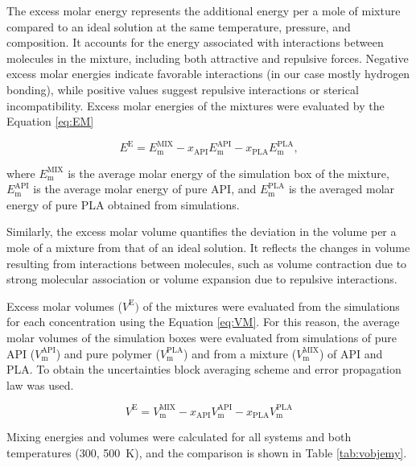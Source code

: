 The excess molar energy represents the additional energy per a mole of mixture compared to an ideal solution at the same temperature, pressure, and composition. It accounts for the energy associated with interactions between molecules in the mixture, including both attractive and repulsive forces. Negative excess molar energies indicate favorable interactions (in our case mostly hydrogen bonding), while positive values suggest repulsive interactions or sterical incompatibility. Excess molar energies of the mixtures were evaluated by the Equation \ref{eq:EM}

\begin{equation}\label{eq:EM}
	E^\text{E} = E_{\text{m}}^{\text{MIX}} - x_{\text{API}} E_{\text{m}}^{\text{API}} - x_{\text{PLA}} E_{\text{m}}^{\text{PLA}},
\end{equation}

where $E_{\text{m}}^{\text{MIX}}$ is the average molar energy of the simulation box of the mixture, $E_{\text{m}}^{\text{API}}$ is the average molar energy of pure API, and $E_{\text{m}}^{\text{PLA}}$ is the averaged molar energy of pure PLA obtained from simulations. 

Similarly, the excess molar volume quantifies the deviation in the volume per a mole of a mixture from that of an ideal solution. It reflects the changes in volume resulting from interactions between molecules, such as volume contraction due to strong molecular association or volume expansion due to repulsive interactions.

Excess molar volumes ($V^{\text{E}})$ of the mixtures were evaluated from the simulations for each concentration using the Equation \ref{eq:VM}. For this reason, the average molar volumes of the simulation boxes were evaluated from simulations of pure API ($V_{\text{m}}^{\text{API}} $) and pure polymer ($V_{\text{m}}^{\text{PLA}}$) and from a mixture ($V_{\text{m}}^{\text{MIX}}$) of API and PLA. To obtain the uncertainties block averaging scheme and error propagation law was used. 
 
\vspace{-0.2cm}

\begin{equation}\label{eq:VM}
	V^{\text{E}} = V_{\text{m}}^{\text{MIX}} - x_{\text{API}} V_{\text{m}}^{\text{API}} - x_{\text{PLA}} V_{\text{m}}^{\text{PLA}}
\end{equation}

Mixing energies and volumes were calculated for all systems and both temperatures (300, 500~K), and the comparison is shown in Table \ref{tab:vobjemy}.  
\vspace{-0.2cm}



